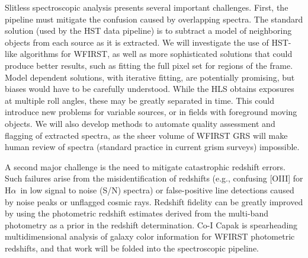  Slitless spectroscopic analysis presents several important challenges.
First, the pipeline must mitigate the confusion caused by overlapping
spectra.  The standard solution (used by the HST data pipeline) is to
subtract a model of neighboring objects from each source as it is
extracted.  We will investigate the use of HST-like algorithms for
WFIRST, as well as more sophisticated solutions that could produce
better results, such as fitting the full pixel set for regions of the
frame.  Model dependent solutions, with iterative fitting, are
potentially promising, but biases would have to be carefully
understood.  While the HLS obtains exposures at multiple roll angles,
these may be greatly separated in time.  This could introduce new
problems for variable sources, or in fields with foreground moving
objects.  We will also develop methods to automate quality assessment
and flagging of extracted spectra, as the sheer volume of WFIRST GRS
will make human review of spectra (standard practice in current grism
surveys) impossible.

A second major challenge is the need to mitigate catastrophic redshift
errors.  Such failures arise from the misidentification of redshifts
(e.g., confusing [OIII] for H$\alpha$\ in low signal to noise (S/N) spectra) or
false-positive line detections caused by noise peaks or unflagged
cosmic rays.  Redshift fidelity can be greatly improved by using the
photometric redshift estimates derived from the multi-band photometry as a prior
in the redshift determination.  Co-I Capak is spearheading
multidimensional analysis of galaxy color information for WFIRST
photometric redshifts, and that work will be folded into the
spectroscopic pipeline.

